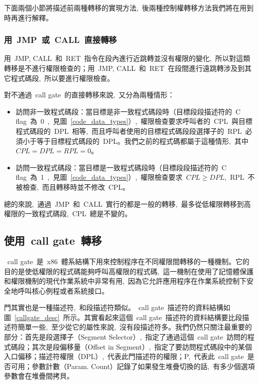 下面兩個小節將描述前兩種轉移的實現方法,~後兩種控制權轉移方法我們將在用到時再進行解釋。

\subsubsection{用~JMP~或~CALL~直接轉移}

用~JMP, CALL~和~RET~指令在段內進行近跳轉並沒有權限的變化,~所以對這類轉移是不進行權限檢查的；用~JMP, CALL~和~RET~在段間進行遠跳轉涉及到其它程式碼段,~所以要進行權限檢查。

對不通過~call gate~的直接轉移來說,~又分為兩種情形：

\begin{itemize}
\item{訪問非一致程式碼段}：當目標是非一致程式碼段時（目標段段描述符的~C flag~為~0~,~見圖~\ref{code_data_types}）,~權限檢查要求呼叫者的~CPL~與目標程式碼段的~DPL~相等,~而且呼叫者使用的目標程式碼段段選擇子的~RPL~必須小于等于目標程式碼段的~DPL。我們之前的程式碼都屬于這種情形,~其中~$CPL=DPL=RPL=0$。
\item{訪問一致程式碼段}：當目標是一致程式碼段時（目標段段描述符的~C flag~為~1~,~見圖~\ref{code_data_types}）,~權限檢查要求~$CPL \ge DPL$,~RPL~不被檢查,~而且轉移時並不修改~CPL。
\end{itemize}

總的來說,~通過~JMP~和~CALL~實行的都是一般的轉移,~最多從低權限轉移到高權限的一致程式碼段,~CPL~總是不變的。

\subsection{使用~call gate~轉移}\label{CHpm_callgate}

~call gate~是~x86~體系結構下用來控制程序在不同權限間轉移的一種機制。它的目的是使低權限的程式碼能夠呼叫高權限的程式碼,~這一機制在使用了記憶體保護和權限機制的現代作業系統中非常有用,~因為它允許應用程序在作業系統控制下安全地呼叫核心例程或者系統接口。


門其實也是一種描述符,~和段描述符類似。~call gate~描述符的資料結構如圖~\ref{callgate_desc}~所示。其實看起來這個~call gate~描述符的資料結構要比段描述符簡單一些,~至少從它的屬性來說,~沒有段描述符多。我們仍然只關注最重要的部分：首先是段選擇子（Segment Selector）,~指定了通過這個~call gate~訪問的程式碼段；其次是段偏移量（Offset in Segment）,~指定了要訪問程式碼段中的某個入口偏移；描述符權限（DPL）,~代表此門描述符的權限；P,~代表此~call gate~是否可用；參數計數（Param. Count）記錄了如果發生堆疊切換的話,~有多少個選項參數會在堆疊間拷貝。

